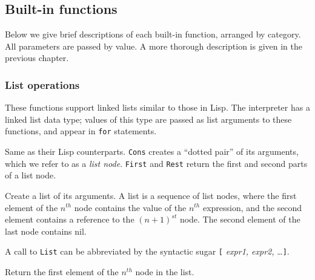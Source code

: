\subsection{Built-in functions}

Below we give brief descriptions of each built-in function, arranged
by category.  All parameters are passed by value.  A more thorough description 
is given in the previous chapter.

\subsubsection{List operations}

These functions support linked lists similar to those in Lisp.  The
interpreter has a linked list data type; values of this type are
passed as list arguments to these functions, and appear in {\tt for}
statements.

\newlength{\oldindent}

\begin{leftlines}


\end{leftlines}

Same as their Lisp counterparts.  {\tt Cons} creates a ``dotted pair'' of
its arguments, which we refer to as a {\em list node}.  {\tt First}
and {\tt Rest} return the first and second parts of a list node.

\begin{leftlines}
\end{leftlines}

Create a list of its arguments.  A list is a sequence of list nodes,
where the first element of the $n^{th}$ node contains the value of the
$n^{th}$ expression, and the second element contains a reference to
the $(n+1)^{st}$ node.  The second element of the last node contains
nil.

A call to {\tt List} can be abbreviated by the syntactic sugar {\tt [}
{\em expr1, expr2,} \ldots {\tt ]}.

\begin{leftlines}
\end{leftlines}

Return the first element of the $n^{th}$ node in the list.

\begin{leftlines}

\end{leftlines}

